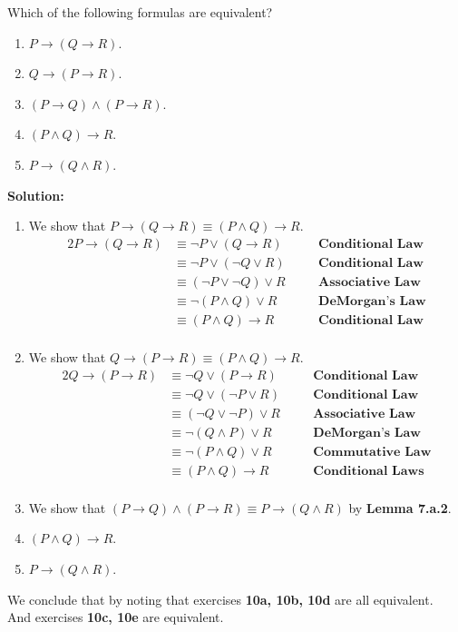 Which of the following formulas are equivalent?
\begin{enumerate}[label=(\alph*)]
    \item $P \rightarrow (Q \rightarrow R)$.
    \item $Q \rightarrow (P \rightarrow R)$.
    \item $(P \rightarrow Q) \wedge (P \rightarrow R)$.
    \item $(P \wedge Q) \rightarrow R$.
    \item $P \rightarrow (Q \wedge R)$.
\end{enumerate}


\textbf{Solution:}
\begin{enumerate}[label=(\alph*)]
    \item We show that $P \rightarrow (Q \rightarrow R) \equiv (P \wedge Q) \rightarrow R$. 
    \begin{alignat*}{2}
        P \rightarrow (Q \rightarrow R) &\equiv \neg P \vee (Q \rightarrow R) && \quad \textbf{Conditional Law}\\
        &\equiv \neg P \vee (\neg Q \vee R) && \quad \textbf{Conditional Law}\\
        &\equiv (\neg P \vee \neg Q) \vee R && \quad \textbf{Associative Law}\\
        &\equiv \neg (P \wedge Q) \vee R && \quad \textbf{DeMorgan's Law}\\
        &\equiv (P \wedge Q) \rightarrow R && \quad \textbf{Conditional Law}\\
    \end{alignat*}
    \item We show that $Q \rightarrow (P \rightarrow R) \equiv (P \wedge Q) \rightarrow R$.
    \begin{alignat*}{2}
        Q \rightarrow (P \rightarrow R) &\equiv \neg Q \vee (P \rightarrow R) && \quad \textbf{Conditional Law}\\
        &\equiv \neg Q \vee (\neg P \vee R) && \quad \textbf{Conditional Law}\\
        &\equiv (\neg Q \vee \neg P) \vee R && \quad \textbf{Associative Law}\\
        &\equiv \neg (Q \wedge P) \vee R && \quad \textbf{DeMorgan's Law}\\
        &\equiv \neg (P \wedge Q) \vee R && \quad \textbf{Commutative Law}\\
        &\equiv (P \wedge Q) \rightarrow R && \quad \textbf{Conditional Laws}\\
    \end{alignat*}
    \item We show that $(P \rightarrow Q) \wedge (P \rightarrow R) \equiv P \rightarrow (Q \wedge R)$ by \textbf{Lemma 7.a.2}.
    \item $(P \wedge Q) \rightarrow R$.
    \item $P \rightarrow (Q \wedge R)$.
\end{enumerate}
We conclude that by noting that exercises \textbf{10a, 10b, 10d} are all equivalent. \\
And exercises \textbf{10c, 10e} are equivalent.